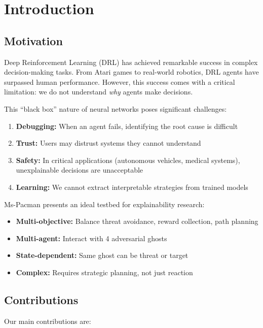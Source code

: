 \documentclass[11pt,a4paper]{article}
\begin{document}
\section{Introduction}

\subsection{Motivation}

Deep Reinforcement Learning (DRL) has achieved remarkable success in complex decision-making tasks. From Atari games to real-world robotics, DRL agents have surpassed human performance. However, this success comes with a critical limitation: we do not understand \textit{why} agents make decisions.

This ``black box'' nature of neural networks poses significant challenges:

\begin{enumerate}
    \item \textbf{Debugging:} When an agent fails, identifying the root cause is difficult
    \item \textbf{Trust:} Users may distrust systems they cannot understand
    \item \textbf{Safety:} In critical applications (autonomous vehicles, medical systems), unexplainable decisions are unacceptable
    \item \textbf{Learning:} We cannot extract interpretable strategies from trained models
\end{enumerate}

Ms-Pacman presents an ideal testbed for explainability research:
\begin{itemize}
    \item \textbf{Multi-objective:} Balance threat avoidance, reward collection, path planning
    \item \textbf{Multi-agent:} Interact with 4 adversarial ghosts
    \item \textbf{State-dependent:} Same ghost can be threat or target
    \item \textbf{Complex:} Requires strategic planning, not just reaction
\end{itemize}

\subsection{Contributions}

Our main contributions are:
\end{document}
